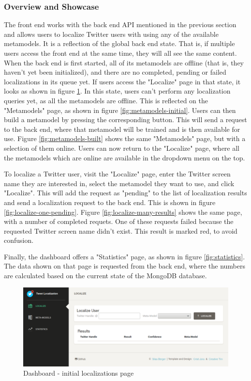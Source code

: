 \documentclass[10pt,a4paper]{article}
\begin{document}
\subsubsection{Overview and Showcase}
The front end works with the back end API mentioned in the previous section and allows users to localize Twitter users with using any of the available metamodels. It is a reflection of the global back end state. That is, if multiple users access the front end at the same time, they will all see the same content. When the back end is first started, all of its metamodels are offline (that is, they haven't yet been initialized), and there are no completed, pending or failed localizations in its queue yet. If users access the "Localize" page in that state, it looks as shown in figure \ref{fig:localize-initial}. In this state, users can't perform any localization queries yet, as all the metamodels are offline. This is reflected on the "Metamodels" page, as shown in figure \ref{fig:metamodels-initial}. Users can then build a metamodel by pressing the corresponding button. This will send a request to the back end, where that metamodel will be trained and is then available for use. Figure \ref{fig:metamodels-built} shows the same "Metamodels" page, but with a selection of them online. Users can now return to the "Localize" page, where all the metamodels which are online are available in the dropdown menu on the top. 

To localize a Twitter user, visit the "Localize" page, enter the Twitter screen name they are interested in, select the metamodel they want to use, and click "Localize". This will add the request as "pending" to the list of localization results and send a localization request to the back end. This is shown in figure \ref{fig:localize-one-pending}. Figure \ref{fig:localize-many-results} shows the same page, with a number of completed requets. One of these requests failed because the requested Twitter screen name didn't exist. This result is marked red, to avoid confusion.

Finally, the dashboard offers a "Statistics" page, as shown in figure \ref{fig:statistics}. The data shown on that page is requested from the back end, where the numbers are calculated based on the current state of the MongoDB database.

\begin{figure}
	\centering
	\includegraphics[scale=0.30]{localize-initial}
	\caption{Dashboard - initial localizations page}
	\label{fig:localize-initial}
\end{figure}
\end{document}
